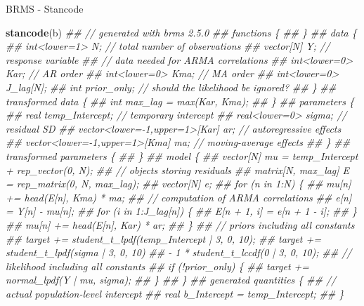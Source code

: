 \documentclass[11pt,ignorenonframetext,]{beamer}
\newenvironment{Shaded}{}{}
\newcommand{\CommentTok}[1]{\textcolor[rgb]{0.38,0.63,0.69}{\textit{#1}}}
\newcommand{\KeywordTok}[1]{\textcolor[rgb]{0.00,0.44,0.13}{\textbf{#1}}}
\newcommand{\NormalTok}[1]{#1}
\let\oldShaded\Shaded
\let\endoldShaded\endShaded
\renewenvironment{Shaded}{\footnotesize\begin{spacing}{0.9}\oldShaded}{\endoldShaded\end{spacing}}
\let\oldverbatim\verbatim
\let\endoldverbatim\endverbatim
\newcommand{\tinyoutput}{
  \renewenvironment{Shaded}{\tiny\begin{spacing}{0.9}\oldShaded}{\endoldShaded\end{spacing}}
  \renewenvironment{verbatim}{\tiny\begin{spacing}{0.9}\oldverbatim}{\endoldverbatim\end{spacing}}
}
\begin{document}
\begin{frame}[fragile]{BRMS - Stancode}
\protect\hypertarget{brms---stancode}{}

\tinyoutput

\begin{Shaded}
\begin{Highlighting}[]
\KeywordTok{stancode}\NormalTok{(b)}
\CommentTok{## // generated with brms 2.5.0}
\CommentTok{## functions \{ }
\CommentTok{## \} }
\CommentTok{## data \{ }
\CommentTok{##   int<lower=1> N;  // total number of observations }
\CommentTok{##   vector[N] Y;  // response variable }
\CommentTok{##   // data needed for ARMA correlations }
\CommentTok{##   int<lower=0> Kar;  // AR order }
\CommentTok{##   int<lower=0> Kma;  // MA order }
\CommentTok{##   int<lower=0> J_lag[N]; }
\CommentTok{##   int prior_only;  // should the likelihood be ignored? }
\CommentTok{## \} }
\CommentTok{## transformed data \{ }
\CommentTok{##   int max_lag = max(Kar, Kma); }
\CommentTok{## \} }
\CommentTok{## parameters \{ }
\CommentTok{##   real temp_Intercept;  // temporary intercept }
\CommentTok{##   real<lower=0> sigma;  // residual SD }
\CommentTok{##   vector<lower=-1,upper=1>[Kar] ar;  // autoregressive effects }
\CommentTok{##   vector<lower=-1,upper=1>[Kma] ma;  // moving-average effects }
\CommentTok{## \} }
\CommentTok{## transformed parameters \{ }
\CommentTok{## \} }
\CommentTok{## model \{ }
\CommentTok{##   vector[N] mu = temp_Intercept + rep_vector(0, N);}
\CommentTok{##   // objects storing residuals }
\CommentTok{##   matrix[N, max_lag] E = rep_matrix(0, N, max_lag); }
\CommentTok{##   vector[N] e; }
\CommentTok{##   for (n in 1:N) \{ }
\CommentTok{##     mu[n] += head(E[n], Kma) * ma;}
\CommentTok{##     // computation of ARMA correlations }
\CommentTok{##     e[n] = Y[n] - mu[n]; }
\CommentTok{##     for (i in 1:J_lag[n]) \{ }
\CommentTok{##       E[n + 1, i] = e[n + 1 - i]; }
\CommentTok{##     \} }
\CommentTok{##     mu[n] += head(E[n], Kar) * ar;}
\CommentTok{##   \} }
\CommentTok{##   // priors including all constants }
\CommentTok{##   target += student_t_lpdf(temp_Intercept | 3, 0, 10); }
\CommentTok{##   target += student_t_lpdf(sigma | 3, 0, 10)}
\CommentTok{##     - 1 * student_t_lccdf(0 | 3, 0, 10); }
\CommentTok{##   // likelihood including all constants }
\CommentTok{##   if (!prior_only) \{ }
\CommentTok{##     target += normal_lpdf(Y | mu, sigma);}
\CommentTok{##   \} }
\CommentTok{## \} }
\CommentTok{## generated quantities \{ }
\CommentTok{##   // actual population-level intercept }
\CommentTok{##   real b_Intercept = temp_Intercept; }
\CommentTok{## \}}
\end{Highlighting}
\end{Shaded}

\end{frame}
\end{document}
